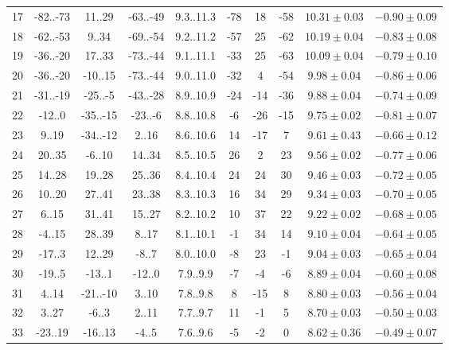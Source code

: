 \begin{tabular}{cccccccccc}
17 & -82..-73 & 11..29 & -63..-49 & 9.3..11.3 & -78 & 18 & -58 & $10.31\pm0.03$ & $-0.90\pm0.09$ \\
18 & -62..-53 & 9..34 & -69..-54 & 9.2..11.2 & -57 & 25 & -62 & $10.19\pm0.04$ & $-0.83\pm0.08$ \\
19 & -36..-20 & 17..33 & -73..-44 & 9.1..11.1 & -33 & 25 & -63 & $10.09\pm0.04$ & $-0.79\pm0.10$ \\
20 & -36..-20 & -10..15 & -73..-44 & 9.0..11.0 & -32 & 4 & -54 & $9.98\pm0.04$ & $-0.86\pm0.06$ \\
21 & -31..-19 & -25..-5 & -43..-28 & 8.9..10.9 & -24 & -14 & -36 & $9.88\pm0.04$ & $-0.74\pm0.09$ \\
22 & -12..0 & -35..-15 & -23..-6 & 8.8..10.8 & -6 & -26 & -15 & $9.75\pm0.02$ & $-0.81\pm0.07$ \\
23 & 9..19 & -34..-12 & 2..16 & 8.6..10.6 & 14 & -17 & 7 & $9.61\pm0.43$ & $-0.66\pm0.12$ \\
24 & 20..35 & -6..10 & 14..34 & 8.5..10.5 & 26 & 2 & 23 & $9.56\pm0.02$ & $-0.77\pm0.06$ \\
25 & 14..28 & 19..28 & 25..36 & 8.4..10.4 & 24 & 24 & 30 & $9.46\pm0.03$ & $-0.72\pm0.05$ \\
26 & 10..20 & 27..41 & 23..38 & 8.3..10.3 & 16 & 34 & 29 & $9.34\pm0.03$ & $-0.70\pm0.05$ \\
27 & 6..15 & 31..41 & 15..27 & 8.2..10.2 & 10 & 37 & 22 & $9.22\pm0.02$ & $-0.68\pm0.05$ \\
28 & -4..15 & 28..39 & 8..17 & 8.1..10.1 & -1 & 34 & 14 & $9.10\pm0.04$ & $-0.64\pm0.05$ \\
29 & -17..3 & 12..29 & -8..7 & 8.0..10.0 & -8 & 23 & -1 & $9.04\pm0.03$ & $-0.65\pm0.04$ \\
30 & -19..5 & -13..1 & -12..0 & 7.9..9.9 & -7 & -4 & -6 & $8.89\pm0.04$ & $-0.60\pm0.08$ \\
31 & 4..14 & -21..-10 & 3..10 & 7.8..9.8 & 8 & -15 & 8 & $8.80\pm0.03$ & $-0.56\pm0.04$ \\
32 & 3..27 & -6..3 & 2..11 & 7.7..9.7 & 11 & -1 & 5 & $8.70\pm0.03$ & $-0.50\pm0.03$ \\
33 & -23..19 & -16..13 & -4..5 & 7.6..9.6 & -5 & -2 & 0 & $8.62\pm0.36$ & $-0.49\pm0.07$ \\
\hline \hline
\end{tabular}
